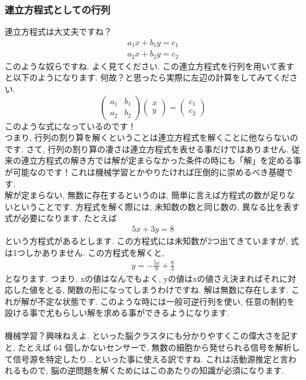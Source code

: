 \documentclass[11pt,a4paper]{jreport}
\begin{document}
\subsubsection{連立方程式としての行列}
連立方程式は大丈夫ですね？
\begin{eqnarray}
a_1x + b_1y = c_1
\end{eqnarray}
\begin{eqnarray}
a_2x + b_2y = c_2
\end{eqnarray}
このような奴らですね. よく見てください. この連立方程式を行列を用いて表すと以下のようになります. 何故？と思ったら実際に左辺の計算をしてみてください. 
\[
  \left(	
  \begin{array}{cc}
  a_1 & b_1 \\
  a_2 & b_2
  \end{array}
  \right)
  \left(
  \begin{array}{c}
  x \\
  y
  \end{array}
  \right)
  =
  \left(
  \begin{array}{l}
  c_1\\
  c_2
  \end{array}
  \right)
\]
このような式になっているのです！\\
つまり, 行列の割り算を解くということは連立方程式を解くことに他ならないのです. 
さて, 行列の割り算の凄さは連立方程式を表せる事だけではありません. 従来の連立方程式の解き方では解が定まらなかった条件の時にも「解」を定める事が可能なのです！これは機械学習とかやりたければ圧倒的に崇めるべき基礎です.\\
解が定まらない, 無数に存在するというのは, 簡単に言えば方程式の数が足りないということです. 方程式を解く際には, 未知数の数と同じ数の, 異なる比を表す式が必要になります. たとえば
\begin{eqnarray}
5x + 3y = 8
\end{eqnarray}
という方程式があるとします. この方程式には未知数が2つ出てきていますが, 式は1つしかありません. この方程式を解くと, 
\begin{eqnarray}
y = -\frac{5x}{8} + \frac{8}{3}
\end{eqnarray}
となります. つまり, xの値はなんでもよく, yの値はxの値さえ決まればそれに対応した値をとる, 関数の形になってしまうわけですね. 解は無数に存在します. これが解が不定な状態です. このような時には一般可逆行列を使い, 任意の制約を設ける事で尤もらしい解を求める事ができるようになります.\\
\\
機械学習？興味ねえよ. といった脳クラスタにも分かりやすくこの偉大さを記すと, たとえば 64 個しかないセンサーで, 無数の細胞から発せられる信号を解析して信号源を特定したり...といった事に使える訳ですね. これは活動源推定と言われるもので, 脳の逆問題を解くためにはこのあたりの知識が必須になります.
 
\end{document}
